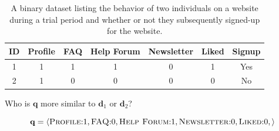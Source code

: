 \documentclass[xcolor={table}]{beamer}
\newcommand{\featN}[1]{\textsc{#1}}
\begin{document}
 \begin{frame} 
\begin{table}[!tb]
\caption{A binary dataset listing the behavior of two individuals on a website during a trial period and whether or not they subsequently signed-up for the website.}
\label{table:binaryDataset}
\centering
\begin{footnotesize}
\begin{tabular}{  c  c  c  c  c  c  c }
\hline
\textbf{ID} & \textbf{Profile} & \textbf{FAQ} & \textbf{Help Forum} & \textbf{Newsletter} & \textbf{Liked} & \textbf{Signup}\\
\hline
1  &  1 & 1 & 1 & 0 & 1 & Yes\\
2  &  1 & 0 & 0 & 0 & 0 & No\\
\hline
\end{tabular}
\end{footnotesize}
\end{table}
\end{frame} 

\begin{frame}
\begin{alertblock}{Who is $\mathbf{q}$ more similar to $\mathbf{d}_1$ or $\mathbf{d}_2$?}
\begin{footnotesize}
\begin{equation*}
\mathbf{q} =  \left< \text{\featN{Profile}:}1, \text{\featN{FAQ}:}0, \text{\featN{Help Forum}:}1, \text{\featN{Newsletter}:}0, \text{\featN{Liked}:}0,\right>  
\end{equation*}
\end{footnotesize}

~\\

\end{alertblock}
\end{frame}
\end{document}
